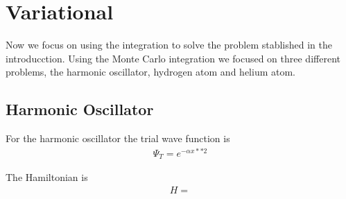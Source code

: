\section{Variational}
 Now we focus on using the integration to solve the problem stablished in the introducction.
 Using the Monte Carlo integration we focused on three different problems, the harmonic oscillator,
 hydrogen atom and helium atom.

\subsection{Harmonic Oscillator}
  For the harmonic oscillator the trial wave function is
  \begin{align}
    \Psi_T = e^{-\alpha x**2}
  \end{align}

  The Hamiltonian is
  \begin{align*}
    H = 
  \end{align*}
